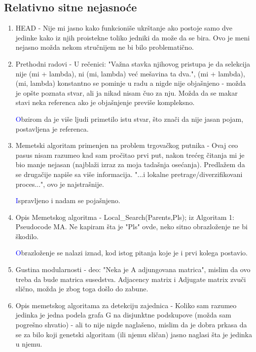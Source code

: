 \documentclass[a4paper]{report}
\newcommand{\odgovor}[1]{\textcolor{blue}{#1}}
\begin{document}
\subsection{Relativno sitne nejasnoće}
\begin{enumerate}
  \item HEAD - Nije mi jasno kako funkcioniše ukrštanje ako postoje samo dve jedinke kako iz njih proistekne toliko jedniki da može da se bira. Ovo je meni nejasno možda nekom stručnijem ne bi bilo problematično.
  
  \item Prethodni radovi - U rečenici: "Važna stavka njihovog pristupa je da selekcija nije (mi + lambda), ni (mi, lambda) već mešavina ta dva.", (mi + lambda), (mi, lambda) konstantno se pominje u radu a nigde nije objašnjeno - možda je opšte poznata stvar, ali ja nikad nisam čuo za nju. Možda da se makar stavi neka referenca ako je objašnjenje previše kompleksno. 
  
  \odgovor Obzirom da je više ljudi primetilo istu stvar, što znači da nije jasan pojam, postavljena je referenca. 
  
  \item Memetski algoritam primenjen na problem trgovačkog putnika - Ovaj ceo pasus nisam razumeo kad sam pročitao prvi put, nakon trećeg čitanja mi je bio manje nejasan (najblaži izraz za moja tadašnja osećanja). Predlažem da se drugačije napiše sa više informacija. "...i lokalne pretrage/diverzifikovani proces...", ovo je najstrašnije. 
  
   \odgovor Ispravljeno i nadam se pojašnjeno.  
   
   \item Opis Memetskog algoritma - Local\_Search(Parents,Pls); iz Algoritam 1: Pseudocode MA. Ne kapiram šta je "Pls" ovde, neko sitno obrazloženje ne bi škodilo. 
   
    \odgovor Obrazloženje se nalazi iznad, kod istog pitanja koje je i prvi kolega postavio.  
    
 \item Gustina modularnosti - deo: "Neka je A adjungovana matrica", mislim da ovo treba da bude matrica susedstva. Adjacency matrix i Adjugate matrix zvuči slično, možda je zbog toga došlo do zabune.
  \item Opis memetskog algoritama za detekciju zajednica - Koliko sam razumeo jedinka je jedna podela grafa G na disjunktne podskupove (možda sam pogrešno shvatio) - ali to nije nigde naglašeno, mislim da je dobra prkasa da se za bilo koji genetski algoritam (ili njemu sličan) jasno naglasi šta je jedinka u njemu.
\end{enumerate}
\end{document}
